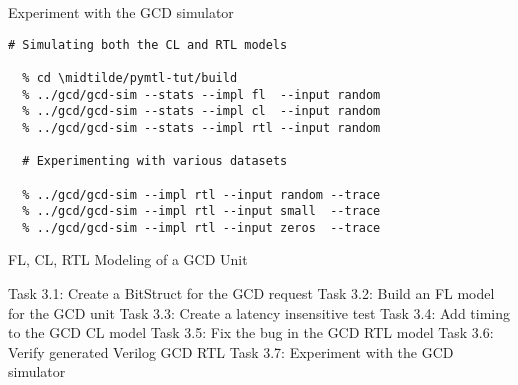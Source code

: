\begin{task}\begin{frame}[fragile]{Experiment with the GCD simulator}

\vspace{-0.15in}
\begin{Verbatim}[commandchars=\\\{\}]
  # Simulating both the CL and RTL models

  % cd \midtilde/pymtl-tut/build
  % ../gcd/gcd-sim --stats --impl fl  --input random
  % ../gcd/gcd-sim --stats --impl cl  --input random
  % ../gcd/gcd-sim --stats --impl rtl --input random

  # Experimenting with various datasets

  % ../gcd/gcd-sim --impl rtl --input random --trace
  % ../gcd/gcd-sim --impl rtl --input small  --trace
  % ../gcd/gcd-sim --impl rtl --input zeros  --trace

\end{Verbatim}
\end{frame}
\end{task}


\begin{frame}{ FL, CL, RTL Modeling of a GCD Unit}
\begin{cbxlist}
  \1 Task 3.1: Create a BitStruct for the GCD request
  \1 Task 3.2: Build an FL model for the GCD unit
  \1 Task 3.3: Create a latency insensitive test
  \1 Task 3.4: Add timing to the GCD CL model
  \1 Task 3.5: Fix the bug in the GCD RTL model
  \1 Task 3.6: Verify generated Verilog GCD RTL
  \1 Task 3.7: Experiment with the GCD simulator
  \1 
\end{cbxlist}
\end{frame}

